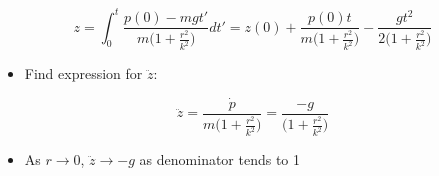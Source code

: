 \documentclass[a4paper,11pt,normalem]{article}
\begin{document}
\begin{example}[2]
\[
    z = \int_{0}^{t} \frac{p(0) - mgt'}{m\big(1 + \tfrac{r^2}{k^2}\big)} dt' = z(0) + \frac{p(0)t}{m\big(1 + \tfrac{r^2}{k^2}\big)} - \frac{gt^2}{2\big(1 + \tfrac{r^2}{k^2}\big)}
\]

\begin{itemize}
\item
  Find expression for \(\ddot{z}\):
\end{itemize}

\[
    \ddot{z} = \frac{\dot{p}}{m\big(1 + \tfrac{r^2}{k^2}\big)} = \frac{-g}{\big(1 + \tfrac{r^2}{k^2}\big)}
\]

\begin{itemize}
\item
  As \(r \to 0\), \(\ddot{z} \to -g\) as denominator tends to 1
\end{itemize}
\end{example}
\end{document}
